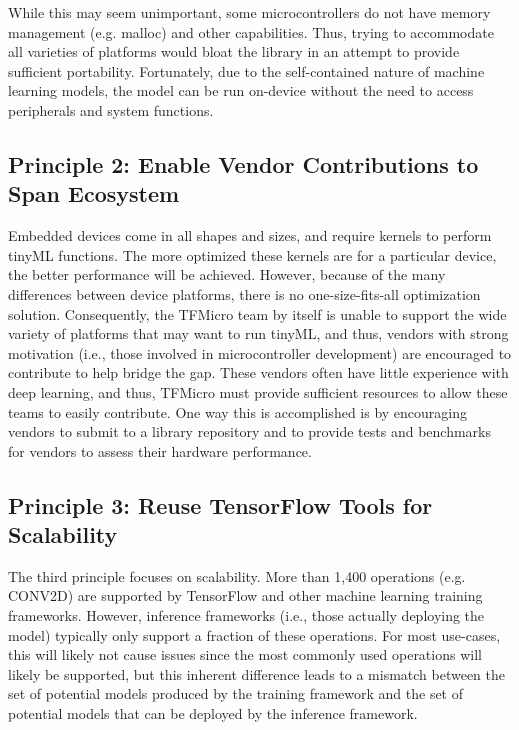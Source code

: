  While this may seem unimportant, some microcontrollers do not have memory management (e.g. malloc) and other capabilities. Thus, trying to accommodate all varieties of platforms would bloat the library in an attempt to provide sufficient portability. Fortunately, due to the self-contained nature of machine learning models, the model can be run on-device without the need to access peripherals and system functions.
 
\subsection{Principle 2: Enable Vendor Contributions to Span Ecosystem}

 Embedded devices come in all shapes and sizes, and require kernels to perform tinyML functions. The more optimized these kernels are for a particular device, the better performance will be achieved. However, because of the many differences between device platforms, there is no one-size-fits-all optimization solution. Consequently, the TFMicro team by itself is unable to support the wide variety of platforms that may want to run tinyML, and thus, vendors with strong motivation (i.e., those involved in microcontroller development) are encouraged to contribute to help bridge the gap. These vendors often have little experience with deep learning, and thus, TFMicro must provide sufficient resources to allow these teams to easily contribute. One way this is accomplished is by encouraging vendors to submit to a library repository and to provide tests and benchmarks for vendors to assess their hardware performance.
 
\subsection{Principle 3: Reuse TensorFlow Tools for Scalability}

 The third principle focuses on scalability. More than 1,400 operations (e.g. CONV2D) are supported by TensorFlow and other machine learning training frameworks. However, inference frameworks (i.e., those actually deploying the model) typically only support a fraction of these operations. For most use-cases, this will likely not cause issues since the most commonly used operations will likely be supported, but this inherent difference leads to a mismatch between the set of potential models produced by the training framework and the set of potential models that can be deployed by the inference framework.
 
